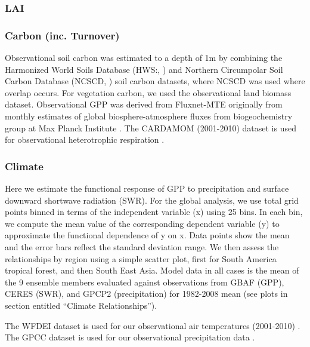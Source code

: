 \subsubsection{LAI}

\subsubsection{Carbon (inc. Turnover)}
Observational soil carbon was estimated to a depth of 1m by combining the Harmonized World Soils Database (HWS:, \cite{nachtergaele2012harmonized}) and Northern Circumpolar Soil Carbon Database (NCSCD, \cite{hugelius2013northern}) soil carbon datasets, where NCSCD was used where overlap occurs. For vegetation carbon, we used the \citep{avitabile2016integrated} observational land biomass dataset. Observational GPP was derived from Fluxnet-MTE originally from monthly estimates of global biosphere-atmosphere fluxes from biogeochemistry group at Max Planck Institute \citet{jung2010recent}. The CARDAMOM (2001-2010) dataset is used for observational heterotrophic respiration \citep{bloom2015cardamom}. 

\subsubsection{Climate}
Here we estimate the functional response of GPP to precipitation and surface downward shortwave radiation (SWR). For the global analysis, we use total grid points binned in terms of the independent variable (x) using 25 bins. In each bin, we compute the mean value of the corresponding dependent variable (y) to approximate the functional dependence of y on x. Data points show the mean and the error bars reﬂect the standard deviation range. We then assess the relationships by region using a simple scatter plot, first for South America tropical forest, and then South East Asia. Model data in all cases is the mean of the 9 ensemble members evaluated against observations from GBAF (GPP), CERES (SWR), and GPCP2 (precipitation) for 1982-2008 mean (see plots in section entitled “Climate Relationships”).

The WFDEI dataset is used for our observational air temperatures (2001-2010) \citep{weedon2014wfdei}. The GPCC dataset is used for our observational precipitation data \citep{schneider2011gpcc}.



